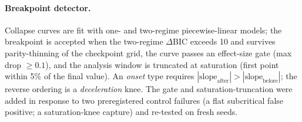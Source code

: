 \documentclass[11pt]{article}
\begin{document}
\paragraph{Breakpoint detector.}
Collapse curves are fit with one- and two-regime piecewise-linear models;
the breakpoint is accepted when the two-regime $\Delta$BIC exceeds 10 and
survives parity-thinning of the checkpoint grid, the curve passes an
effect-size gate (max drop $\geq 0.1$), and the analysis window is
truncated at saturation (first point within 5\% of the final value). An
\emph{onset} type requires
$|\mathrm{slope}_\mathrm{after}| > |\mathrm{slope}_\mathrm{before}|$; the
reverse ordering is a \emph{deceleration} knee. The gate and
saturation-truncation were added in response to two preregistered control
failures (a flat subcritical false positive; a saturation-knee capture)
and re-tested on fresh seeds.
\end{document}
